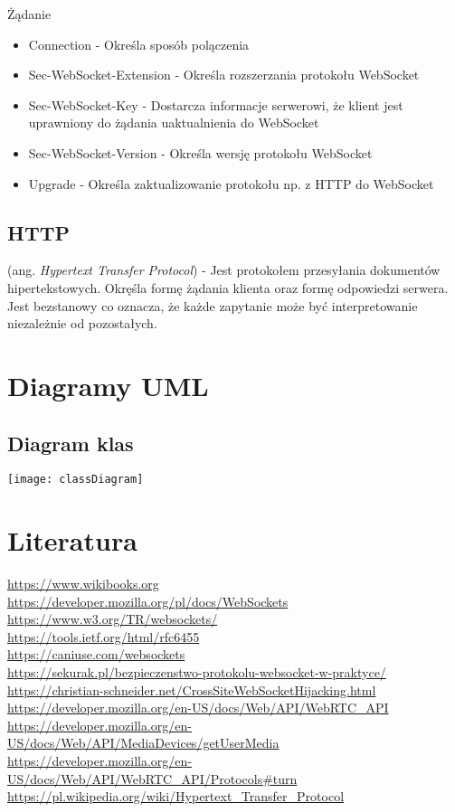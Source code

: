 \documentclass{article}
\begin{document}
Żądanie
\begin{itemize}
  \item Connection - Określa sposób polączenia
  \item Sec-WebSocket-Extension - Określa rozszerzania protokołu WebSocket
  \item Sec-WebSocket-Key - Dostarcza informacje serwerowi, że klient jest uprawniony do żądania uaktualnienia do WebSocket
  \item Sec-WebSocket-Version - Określa wersję protokołu WebSocket
  \item Upgrade - Określa zaktualizowanie protokołu np. z HTTP do WebSocket
\end{itemize}

\subsection{HTTP}
(ang. \emph{Hypertext Transfer Protocol}) - Jest protokołem przesyłania dokumentów hipertekstowych. Okręśla formę żądania klienta oraz formę odpowiedzi serwera. Jest bezstanowy co oznacza, że każde zapytanie może być interpretowanie niezależnie od pozostałych.

\section{Diagramy UML}

\subsection{Diagram klas}
\texttt{[image: classDiagram]}


\section{Literatura}

\url{https://www.wikibooks.org}\\
\url{https://developer.mozilla.org/pl/docs/WebSockets}\\
\url{https://www.w3.org/TR/websockets/}\\
\url{https://tools.ietf.org/html/rfc6455}\\
\url{https://caniuse.com/websockets}\\
\url{https://sekurak.pl/bezpieczenstwo-protokolu-websocket-w-praktyce/}\\
\url{https://christian-schneider.net/CrossSiteWebSocketHijacking.html}\\
\url{https://developer.mozilla.org/en-US/docs/Web/API/WebRTC_API}\\
\url{https://developer.mozilla.org/en-US/docs/Web/API/MediaDevices/getUserMedia}\\
\url{https://developer.mozilla.org/en-US/docs/Web/API/WebRTC_API/Protocols#turn}\\
\url{https://pl.wikipedia.org/wiki/Hypertext_Transfer_Protocol}
\end{document}
